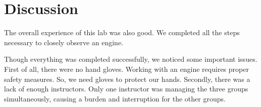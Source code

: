 \section{Discussion}

The overall experience of this lab was also good. We completed all the steps necessary to closely observe an engine.

Though everything was completed successfully, we noticed some important issues. First of all, there were no hand gloves. Working with an engine requires proper safety measures. So, we need gloves to protect our hands. Secondly, there was a lack of enough instructors. Only one instructor was managing the three groups simultaneously, causing a burden and interruption for the other groups.
